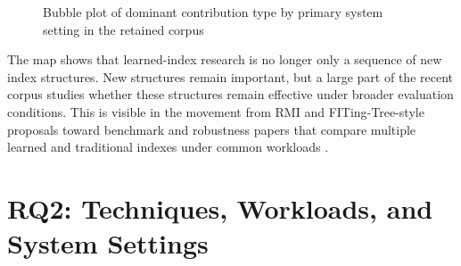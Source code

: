 \documentclass[a4paper, 12pt, twoside]{report}
\begin{document}
\begin{figure}[h]
\centering
{}
\caption{Bubble plot of dominant contribution type by primary system setting in the retained corpus}
\label{fig:contribution-setting-bubble}
\end{figure}

The map shows that learned-index research is no longer only a sequence of new index structures. New structures remain important, but a large part of the recent corpus studies whether these structures remain effective under broader evaluation conditions. This is visible in the movement from RMI and FITing-Tree-style proposals toward benchmark and robustness papers that compare multiple learned and traditional indexes under common workloads \cite{kraska2018,galakatos2019fiting,marcus2020benchmarking,sun2023learned,wongkham2022ready,luo2025robustness}.

\section{RQ2: Techniques, Workloads, and System Settings}
\end{document}

